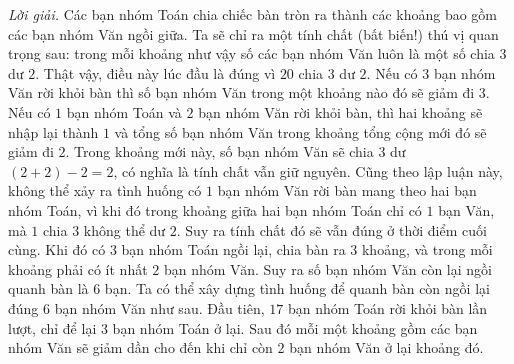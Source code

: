 \begin{multicols}{2}
	\vskip 0.1cm
	\textit{Lời giải.} 	Các bạn nhóm Toán chia chiếc bàn tròn ra thành các khoảng bao gồm các bạn nhóm Văn ngồi giữa. Ta sẽ chỉ ra một tính chất (bất biến!) thú vị quan trọng sau: trong mỗi khoảng như vậy số các bạn nhóm Văn luôn là một số chia $3$ dư $2$. Thật vậy, điều này lúc đầu là đúng vì $20$ chia $3$ dư $2$. Nếu có $3$ bạn nhóm Văn rời khỏi bàn thì số bạn nhóm Văn trong một khoảng nào đó sẽ giảm đi $3$. Nếu có $1$ bạn nhóm Toán và $2$ bạn nhóm Văn rời khỏi bàn, thì hai khoảng sẽ nhập lại thành $1$ và tổng số bạn nhóm Văn trong khoảng tổng cộng mới đó sẽ giảm đi $2$.  Trong khoảng mới này, số bạn nhóm Văn sẽ chia $3$ dư $(2+2)-2 = 2$, có nghĩa là tính chất vẫn giữ nguyên. Cũng theo lập luận này, không thể xảy ra tình huống có $1$ bạn nhóm Văn rời bàn mang theo hai bạn nhóm Toán, vì khi đó trong khoảng giữa hai bạn nhóm Toán chỉ có $1$ bạn Văn, mà $1$ chia $3$ không thể dư $2$.
	\vskip 0.1cm
	Suy ra tính chất đó sẽ vẫn đúng ở thời điểm cuối cùng. Khi đó có $3$ bạn nhóm Toán ngồi lại, chia bàn ra $3$ khoảng, và trong mỗi khoảng phải có ít nhất $2$ bạn nhóm Văn. Suy ra số bạn nhóm Văn còn lại ngồi quanh bàn là $6$ bạn. 
	\vskip 0.1cm
	Ta có thể xây dựng tình huống để quanh bàn còn ngồi lại đúng $6$ bạn nhóm Văn như sau. Đầu tiên, $17$ bạn nhóm Toán rời khỏi bàn lần lượt, chỉ để lại $3$ bạn nhóm Toán ở lại. Sau đó mỗi một khoảng gồm các bạn nhóm Văn sẽ giảm dần cho đến khi chỉ còn $2$ bạn nhóm Văn ở lại khoảng đó.
\end{multicols}
\newpage
\begingroup
\thispagestyle{toancuabinone}
